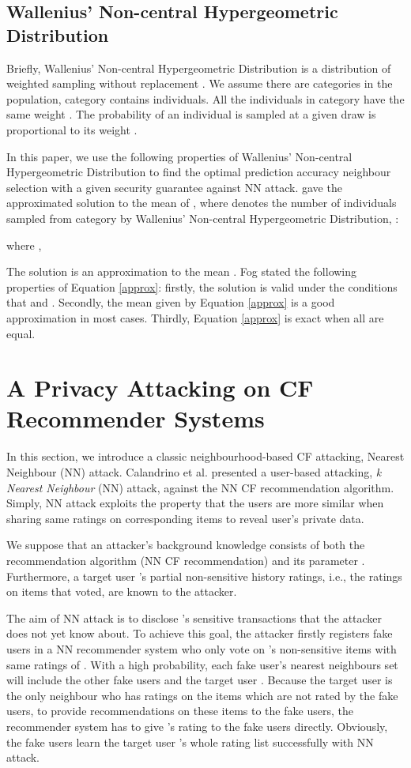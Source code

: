 \documentclass[11pt]{article}
\begin{document}
\subsection{Wallenius' Non-central Hypergeometric Distribution}
\label{WNHD}
Briefly, Wallenius' Non-central Hypergeometric Distribution is a distribution of weighted sampling without replacement \cite{WALLENIUS1963}. We assume there are  categories in the population, category  contains  individuals. All the individuals in category  have the same weight . The probability of an individual is sampled at a given draw is proportional to its weight .

In this paper, we use the following properties of Wallenius' Non-central Hypergeometric Distribution to find the optimal prediction accuracy neighbour selection with a given security guarantee against NN attack. \cite{MANLY1974} gave the approximated solution to the mean  of , where  denotes the number of individuals sampled from category  by Wallenius' Non-central Hypergeometric Distribution, :

where , 

The solution  is an approximation to the mean . Fog \cite{FOG2008} stated the following properties of Equation \eqref{approx}: firstly, the solution  is valid under the conditions that  and . Secondly, the mean given by Equation \eqref{approx} is a good approximation in most cases. Thirdly, Equation \eqref{approx} is exact when all  are equal.


\section{A Privacy Attacking on CF Recommender Systems}
\label{ATK}
In this section, we introduce a classic neighbourhood-based CF attacking,  Nearest Neighbour (NN) attack. Calandrino et al. \cite{CALANDRINO2011} presented a user-based attacking, \textit{k Nearest Neighbour} (NN) attack, against the NN CF recommendation algorithm. Simply, NN attack exploits the property that the users are more similar when sharing same ratings on corresponding items to reveal user's private data.

We suppose that an attacker's background knowledge consists of both the recommendation algorithm (NN CF recommendation) and its parameter . Furthermore, a target user 's partial non-sensitive history ratings, i.e., the ratings on  items that  voted, are known to the attacker.

The aim of NN attack is to disclose 's sensitive transactions that the attacker does not yet know about. To achieve this goal, the attacker firstly registers  fake users in a NN recommender system who only vote on 's  non-sensitive items with same ratings of . With a high probability, each fake user's  nearest neighbours set  will include the other  fake users and the target user . Because the target user  is the only neighbour who has ratings on the items which are not rated by the fake users, to provide recommendations on these items to the fake users, the recommender system has to give 's rating to the fake users directly. Obviously, the fake users learn the target user 's whole rating list successfully with NN attack.
\end{document}
